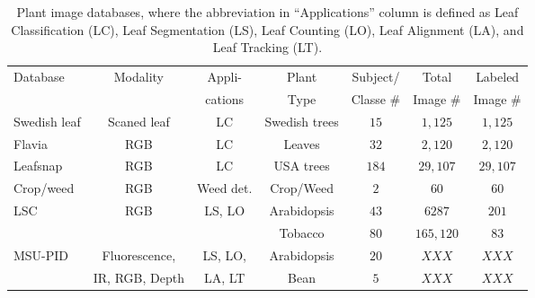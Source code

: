 \begin{table}[t!]
	\centering
	\caption{Plant image databases, where the abbreviation in ``Applications'' column is defined as Leaf Classification (LC), Leaf Segmentation (LS), Leaf Counting (LO), Leaf Alignment (LA), and Leaf Tracking (LT).}
	\resizebox{12cm}{!} {
	\begin{tabular}{l|c|c|c|c|c|c}
		\hline
		\multirow{2}{*}{Database}&  \multirow{2}{*}{Modality}  & Appli-& Plant & Subject/ &Total  &  Labeled   \\ 						
			&         & cations &            Type         &       Classe \#         &  Image \#    & Image \# \\ \hline
		
Swedish leaf &  Scaned leaf & LC& Swedish trees & $15$ & $1,125$ & $1,125$ \\ \hline
Flavia& RGB  & LC& Leaves & $32$  & $2,120$ & $2,120$ \\ \hline
Leafsnap  & RGB & LC& USA trees & $184$ & $29,107$  &  $29,107$ \\ \hline
Crop/weed &  RGB &Weed det. & Crop/Weed & $2$  & $60$ & $60$ \\ \hline
\multirow{2}{*}{LSC} & \multirow{2}{*}{RGB}  & \multirow{2}{*}{LS, LO} & Arabidopsis &  $43$ & $6287$ & $201$ \\ \cline{4-7}
							    &  & & Tobacco & $80$ & $165,120$ & $83$ \\ \hline
\multirow{2}{*}{MSU-PID}  & Fluorescence,  & LS, LO, & Arabidopsis &  $20$ & $XXX$ & $XXX$ \\ \cline{4-7}
							    & IR, RGB, Depth & LA, LT & Bean & $5$ & $XXX$ & $XXX$ \\ \hline
	       \hline
	\end{tabular}
	}
	\label{tab:database}
\end{table}
